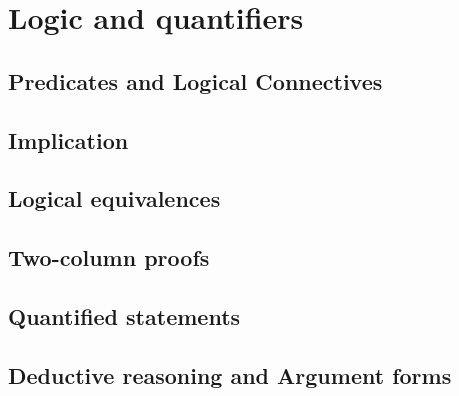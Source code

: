\chapter{Logic and quantifiers}

\section{Predicates and Logical Connectives}




\newpage

\section{Implication}




\newpage

\section{Logical equivalences}




\newpage
\section{Two-column proofs}




\newpage

\section{Quantified statements}




\newpage

\section{Deductive reasoning and Argument forms}

